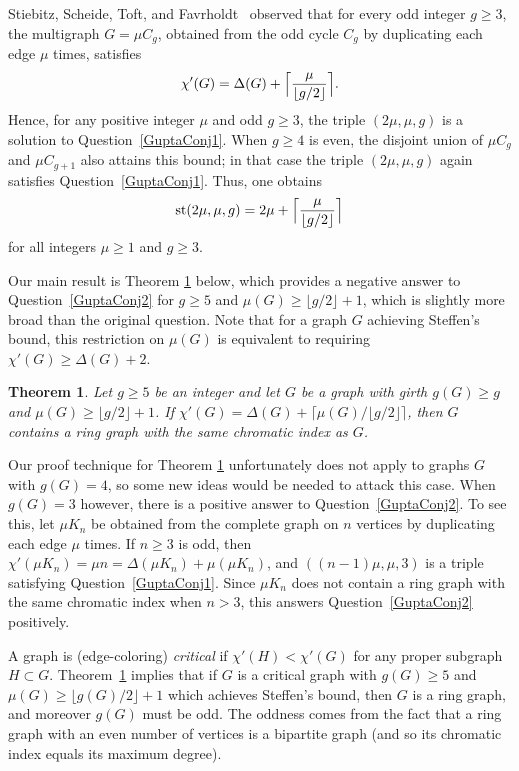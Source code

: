 \documentclass[12pt,oneside]{amsart}
\newtheorem{theorem}{Theorem}[section]
\begin{document}
Stiebitz, Scheide, Toft, and Favrholdt~\cite{MR2975974} observed that for every odd integer \(g \ge 3\), the multigraph
\(G = \mu C_g\),
obtained from the odd cycle \(C_g\) by duplicating each edge \(\mu\) times, satisfies
\[
\chi'(G) = \Delta(G) + \Bigl\lceil \frac{\mu}{\lfloor g/2\rfloor}\Bigr\rceil.
\]
Hence, for any positive integer \(\mu\) and odd \(g \ge 3\), the triple \((2\mu, \mu, g)\) is a solution to Question~\ref{GuptaConj1}.
When \(g \ge 4\) is even, the disjoint union of \(\mu C_g\) and \(\mu C_{g+1}\) also attains this bound; in that case the triple \((2\mu,\mu,g)\) again satisfies Question~\ref{GuptaConj1}.
Thus, one obtains
\[
\mathrm{st}(2\mu,\mu,g) = 2\mu + \Bigl\lceil \frac{\mu}{\lfloor g/2\rfloor}\Bigr\rceil
\]
for all integers \(\mu\ge1\) and \(g\ge3\).

Our main result is Theorem \ref{thm-main} below, which provides a negative answer to Question~\ref{GuptaConj2} for $g\geq 5$ and $\mu(G) \geq \lfloor g/2 \rfloor+1$, which is slightly more broad than the original question. Note that for a graph $G$ achieving Steffen's bound, this restriction on $\mu(G)$ is equivalent to requiring $\chi'(G)\geq \Delta(G)+2$.

\begin{theorem}\label{thm-main}
Let $g\ge 5$ be an integer and let $G$ be a graph with girth $g(G) \geq g$ and  $\mu(G) \geq \lfloor g/2 \rfloor+1$. If $\chi'(G) = \Delta(G) + \lceil \mu(G)/\lfloor g/2 \rfloor\rceil$, then $G$ contains a ring graph with the same chromatic index as $G$.
\end{theorem}

Our proof technique for Theorem \ref{thm-main} unfortunately does not apply to graphs $G$ with $g(G) =4$, so some new ideas would be needed to attack this case.  When $g(G)=3$ however, there is a positive answer to Question~\ref{GuptaConj2}. To see this, let $\mu K_n$ be obtained from the complete graph on $n$ vertices by duplicating each edge $\mu$ times. If $n\geq3$ is odd, then $\chi'(\mu K_n) = \mu n= \Delta(\mu K_n) + \mu(\mu K_n)$,  and $((n-1)\mu, \mu, 3)$ is a triple satisfying Question~\ref{GuptaConj1}. Since $\mu K_n$ does not contain a ring graph with the same chromatic index when $n>3$, this answers Question~\ref{GuptaConj2}  positively.

A graph is  (edge-coloring) \textit{critical} if $\chi'(H) < \chi'(G)$ for any proper subgraph $H \subset G$. Theorem~\ref{thm-main} implies that if $G$ is a critical graph with $g(G)\geq 5$ and $\mu(G) \ge \lfloor g(G)/2 \rfloor +1$ which achieves Steffen's bound, then $G$ is a ring graph, and moreover $g(G)$ must be odd. The oddness comes from the fact that a ring graph with an even number of vertices is a bipartite graph (and so its chromatic index equals its maximum degree).
\end{document}
